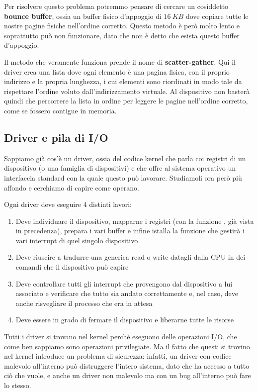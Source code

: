 \documentclass[11pt, a4paper, titlepage, oneside]{scrbook}
\begin{document}
Per risolvere questo problema potremmo pensare di cercare un cosiddetto \textbf{bounce buffer}, ossia un buffer fisico d'appoggio di $\SI{16}{KB}$ dove copiare tutte le nostre pagine fisiche nell'ordine corretto. Questo metodo è però molto lento e soprattutto può non funzionare, dato che non è detto che esista questo buffer d'appoggio. 

Il metodo che veramente funziona prende il nome di \textbf{scatter-gather}. Qui il driver crea una lista dove ogni elemento è una pagina fisica, con il proprio indirizzo e la propria lunghezza, i cui elementi sono riordinati in modo tale da rispettare l'ordine voluto dall'indirizzamento virtuale. Al dispositivo non basterà quindi che percorrere la lista in ordine per leggere le pagine nell'ordine corretto, come se fossero contigue in memoria.

\subsection{Driver e pila di I/O}

Sappiamo già cos'è un driver, ossia del codice kernel che parla coi registri di un dispositivo (o una famiglia di dispositivi) e che offre al sistema operativo un interfaccia standard con la quale questo può lavorare. Studiamoli ora però più affondo e cerchiamo di capire come operano.

Ogni driver deve eseguire 4 distinti lavori:
\begin{enumerate}
    \item Deve individuare il dispositivo, mapparne i registri (con la funzione , già vista in precedenza), prepara i vari buffer e infine istalla la funzione che gestirà i vari interrupt di quel singolo dispositivo
    \item Deve riuscire a tradurre una generica read o write datagli dalla CPU in dei comandi che il dispositivo può capire
    \item Deve controllare tutti gli interrupt che provengono dal dispositivo a lui associato e verificare che tutto sia andato correttamente e, nel caso, deve anche risvegliare il processo che era in attesa
    \item Deve essere in grado di fermare il dispositivo e liberarne tutte le risorse
\end{enumerate}

Tutti i driver si trovano nel kernel perché eseguono delle operazioni I/O, che come ben sappiamo sono operazioni privilegiate. Ma il fatto che questi si trovino nel kernel introduce un problema di sicurezza: infatti, un driver con codice malevolo all'interno può distruggere l'intero sistema, dato che ha accesso a tutto ciò che vuole, e anche un driver non malevolo ma con un bug all'interno può fare lo stesso.
\end{document}
